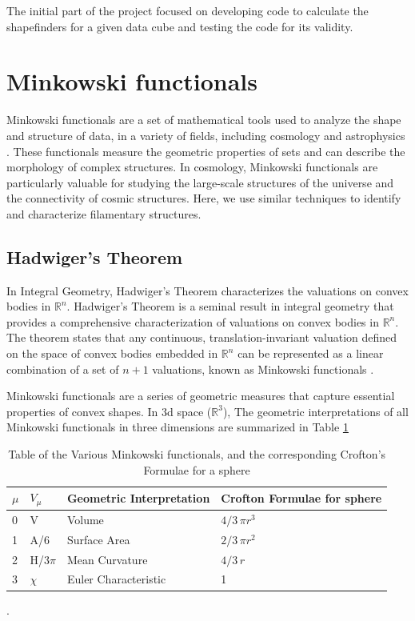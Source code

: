 \documentclass{article}
\begin{document}
The initial part of the project focused on developing code to calculate the shapefinders for a given data cube and testing the code for its validity.

\section{Minkowski functionals}
Minkowski functionals are a set of mathematical tools used to analyze the shape and structure of data, in a variety of fields, including cosmology and astrophysics \cite{1999PaperMinkowskiFunctionalsInCosmology}. These functionals measure the geometric properties of sets and can describe the morphology of complex structures. In cosmology, Minkowski functionals are particularly valuable for studying the large-scale structures of the universe and the connectivity of cosmic structures. Here, we use similar techniques to identify and characterize filamentary structures.


\subsection{Hadwiger's Theorem}
In Integral Geometry, Hadwiger's Theorem characterizes the valuations on convex bodies in $\mathbb{R}^n$. Hadwiger's Theorem is a seminal result in integral geometry that provides a comprehensive characterization of valuations on convex bodies in $\mathbb{R}^n$. The theorem states that any continuous, translation-invariant valuation defined on the space of convex bodies embedded in $\mathbb{R}^n$ can be represented as a linear combination of a set of $n+1$ valuations, known as Minkowski functionals \cite{adler_taylor_2007}.

Minkowski functionals are a series of geometric measures that capture essential properties of convex shapes. In 3d space ($\mathbb{R}^3$), The geometric interpretations of all Minkowski functionals in three dimensions are summarized in Table \ref{table:table_of_formulae} 

\begin{table}[]
\centering
\begin{tabular}{|l|l|l|l|}
\hline
\textbf{$\mu$} & \textbf{$V_\mu$} & \textbf{Geometric Interpretation} & \textbf{Crofton Formulae for sphere} \\ \hline
0              & V                & Volume                            & $4/3 \, \pi r^3$                \\ \hline
1              & A/6              & Surface Area                      & $2/3 \, \pi r^2$                  \\ \hline
2              & H/$3\pi$         & Mean Curvature                    & $4/3\,r$                        \\ \hline
3              & $\chi$           & Euler Characteristic              & 1                                    \\ \hline
\end{tabular}
\caption{Table of the Various Minkowski functionals, and the corresponding Crofton's Formulae for a sphere \cite{AmitSetaThesis}}.
\label{table:table_of_formulae}
\end{table}
\end{document}
